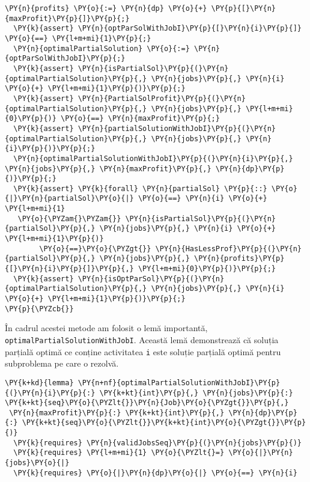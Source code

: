 \begin{itemize}
\begin{Verbatim}[commandchars=\\\{\}, fontsize=\footnotesize]
  \PY{n}{profits} \PY{o}{:=} \PY{n}{dp} \PY{o}{+} \PY{p}{[}\PY{n}{maxProfit}\PY{p}{]}\PY{p}{;}
  \PY{k}{assert} \PY{n}{optParSolWithJobI}\PY{p}{[}\PY{n}{i}\PY{p}{]} \PY{o}{==} \PY{l+m+mi}{1}\PY{p}{;}
  \PY{n}{optimalPartialSolution} \PY{o}{:=} \PY{n}{optParSolWithJobI}\PY{p}{;} 
  \PY{k}{assert} \PY{n}{isPartialSol}\PY{p}{(}\PY{n}{optimalPartialSolution}\PY{p}{,} \PY{n}{jobs}\PY{p}{,} \PY{n}{i} \PY{o}{+} \PY{l+m+mi}{1}\PY{p}{)}\PY{p}{;}
  \PY{k}{assert} \PY{n}{PartialSolProfit}\PY{p}{(}\PY{n}{optimalPartialSolution}\PY{p}{,} \PY{n}{jobs}\PY{p}{,} \PY{l+m+mi}{0}\PY{p}{)} \PY{o}{==} \PY{n}{maxProfit}\PY{p}{;}
  \PY{k}{assert} \PY{n}{partialSolutionWithJobI}\PY{p}{(}\PY{n}{optimalPartialSolution}\PY{p}{,} \PY{n}{jobs}\PY{p}{,} \PY{n}{i}\PY{p}{)}\PY{p}{;}
  \PY{n}{optimalPartialSolutionWithJobI}\PY{p}{(}\PY{n}{i}\PY{p}{,} \PY{n}{jobs}\PY{p}{,} \PY{n}{maxProfit}\PY{p}{,} \PY{n}{dp}\PY{p}{)}\PY{p}{;}
  \PY{k}{assert} \PY{k}{forall} \PY{n}{partialSol} \PY{p}{::} \PY{o}{|}\PY{n}{partialSol}\PY{o}{|} \PY{o}{==} \PY{n}{i} \PY{o}{+} \PY{l+m+mi}{1}  
   \PY{o}{\PYZam{}\PYZam{}} \PY{n}{isPartialSol}\PY{p}{(}\PY{n}{partialSol}\PY{p}{,} \PY{n}{jobs}\PY{p}{,} \PY{n}{i} \PY{o}{+} \PY{l+m+mi}{1}\PY{p}{)}
        \PY{o}{==}\PY{o}{\PYZgt{}} \PY{n}{HasLessProf}\PY{p}{(}\PY{n}{partialSol}\PY{p}{,} \PY{n}{jobs}\PY{p}{,} \PY{n}{profits}\PY{p}{[}\PY{n}{i}\PY{p}{]}\PY{p}{,} \PY{l+m+mi}{0}\PY{p}{)}\PY{p}{;}
  \PY{k}{assert} \PY{n}{isOptParSol}\PY{p}{(}\PY{n}{optimalPartialSolution}\PY{p}{,} \PY{n}{jobs}\PY{p}{,} \PY{n}{i} \PY{o}{+} \PY{l+m+mi}{1}\PY{p}{)}\PY{p}{;}
\PY{p}{\PYZcb{}}
\end{Verbatim}
În cadrul acestei metode am folosit o lemă importantă, \\\texttt{optimalPartialSolutionWithJobI}. Această lemă demonstrează că soluția parțială optimă ce conține activitatea \texttt{i} este soluție parțială optimă pentru subproblema pe care o rezolvă.
\begin{Verbatim}[commandchars=\\\{\},fontsize=\footnotesize]
\PY{k+kd}{lemma} \PY{n+nf}{optimalPartialSolutionWithJobI}\PY{p}{(}\PY{n}{i}\PY{p}{:} \PY{k+kt}{int}\PY{p}{,} \PY{n}{jobs}\PY{p}{:} \PY{k+kt}{seq}\PY{o}{\PYZlt{}}\PY{n}{Job}\PY{o}{\PYZgt{}}\PY{p}{,}
 \PY{n}{maxProfit}\PY{p}{:} \PY{k+kt}{int}\PY{p}{,} \PY{n}{dp}\PY{p}{:} \PY{k+kt}{seq}\PY{o}{\PYZlt{}}\PY{k+kt}{int}\PY{o}{\PYZgt{}}\PY{p}{)}
  \PY{k}{requires} \PY{n}{validJobsSeq}\PY{p}{(}\PY{n}{jobs}\PY{p}{)}
  \PY{k}{requires} \PY{l+m+mi}{1} \PY{o}{\PYZlt{}=} \PY{o}{|}\PY{n}{jobs}\PY{o}{|}
  \PY{k}{requires} \PY{o}{|}\PY{n}{dp}\PY{o}{|} \PY{o}{==} \PY{n}{i}

\end{Verbatim}
\end{itemize}
